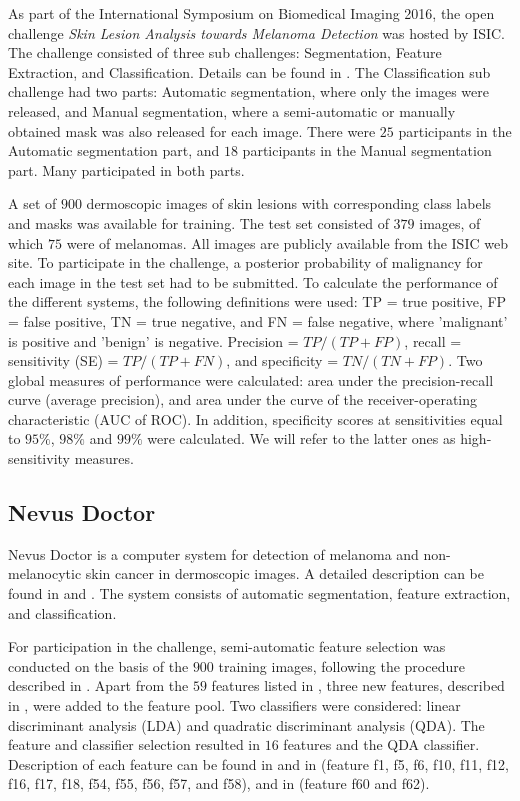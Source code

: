 \documentclass[a4paper,12pt]{article}
\begin{document}
As part of the International Symposium on Biomedical Imaging 2016, the open challenge {\it Skin Lesion Analysis towards Melanoma Detection} was hosted by ISIC. 
The challenge consisted of three sub challenges: Segmentation, Feature Extraction, and Classification. 
Details can be found in \cite{Gutman2016Skin}. 
The Classification sub challenge had two parts: Automatic segmentation, where only the images were released, and Manual segmentation, where a semi-automatic or manually obtained mask was also released for each image. 
There were $25$ participants in the Automatic segmentation part, and $18$ participants in the Manual segmentation part. 
Many participated in both parts. 

A set of $900$ dermoscopic images of skin lesions with corresponding class labels and masks was available for training. 
The test set consisted of $379$ images, of which $75$ were of melanomas. 
All images are publicly available from the ISIC web site. 
To participate in the challenge, a posterior probability of malignancy for each image in the test set had to be submitted. 
To calculate the performance of the different systems, the following definitions were used: TP = true positive, FP = false positive, TN = true negative, and FN = false negative, where 'malignant' is positive and 'benign' is negative. 
Precision = $TP/(TP+FP)$, recall = sensitivity (SE) = $TP/(TP+FN)$, and specificity = $TN/(TN+FP)$. 
Two global measures of performance were calculated: area under the precision-recall curve (average precision), and area under the curve of the receiver-operating characteristic (AUC of ROC). 
In addition, specificity scores at sensitivities equal to $95\%$, $98\%$ and $99\%$ were calculated. 
We will refer to the latter ones as high-sensitivity measures. 

\subsection{Nevus Doctor} \label{sec:NevusDoctor}

Nevus Doctor is a computer system for detection of melanoma and non-melanocytic skin cancer in dermoscopic images. 
A detailed description can be found in \cite{Mollersen2015Improved} and \cite{Zortea2014Performance}. 
The system consists of automatic segmentation, feature extraction, and classification. 

For participation in the challenge, semi-automatic feature selection was conducted on the basis of the $900$ training images, following the procedure described in \cite{Mollersen2015Improved}. 
Apart from the $59$ features listed in \cite{Mollersen2015Improved}, three new features, described in \cite{Mollersen2015Divergencebased}, were added to the feature pool. 
Two classifiers were considered: linear discriminant analysis (LDA) and quadratic discriminant analysis (QDA). 
The feature and classifier selection resulted in $16$ features and the QDA classifier. 
Description of each feature can be found in \cite{Mollersen2015Improved} and in \cite{Zortea2014Performance} (feature f1, f5, f6, f10, f11, f12, f16, f17, f18, f54, f55, f56, f57, and f58), and in  \cite{Mollersen2015Divergencebased} (feature f60 and f62).
\end{document}
